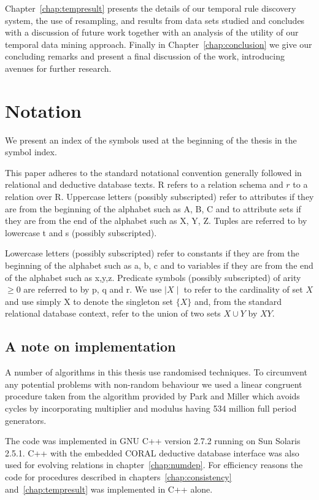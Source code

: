 \medskip

Chapter~\ref{chap:tempresult} presents the details of our temporal
rule discovery system, the use of resampling, and results from data
sets studied and concludes with a discussion of future work together
with an analysis of the utility of our temporal data mining approach.
Finally in Chapter~\ref{chap:conclusion} we give our concluding
remarks and present a final discussion of the work, introducing
avenues for further research.


\section{Notation}

We present an index of the symbols used at the beginning of the thesis
in the symbol index.

\smallskip

This paper adheres to the standard notational convention generally followed in
relational and deductive database texts.  R refers to a relation
schema and $r$ to a relation over R.  Uppercase letters (possibly
subscripted) refer to attributes if they are from the beginning of the
alphabet such as A, B, C and to attribute sets if they are from the
end of the alphabet such as X, Y, Z.  Tuples are referred to by
lowercase t and s (possibly subscripted).

\medskip

Lowercase letters (possibly subscripted) refer to constants if they are from the beginning of the alphabet such as a, b, c and to variables if they are from the end of the alphabet such as x,y,z.  Predicate symbols (possibly subscripted) of arity $\ge 0$ are referred to by
p, q and r. 
We use $\mid X \mid$ to refer to the cardinality of set $X$ and use simply
X to denote the singleton set $\{ X \}$ and, from the standard
relational database context, refer to the union of
two sets $X \cup Y$ by $XY$. 

\subsection{A note on implementation}

A number of algorithms in this thesis use randomised techniques. To
circumvent any potential problems with non-random behaviour we used
a linear congruent procedure taken
from the algorithm provided by Park and Miller \cite{pm88} which
avoids cycles by incorporating multiplier and modulus
having 534 million full period generators. 

\smallskip
The code was implemented in GNU C++ version 2.7.2 running
on Sun Solaris 2.5.1.  C++ with
the embedded CORAL deductive
database interface \cite{rss92} was also used for evolving relations
in chapter~\ref{chap:numdep}. For efficiency reasons the code for procedures
described in chapters~\ref{chap:consistency} and~\ref{chap:tempresult}
was implemented in C++ alone.


